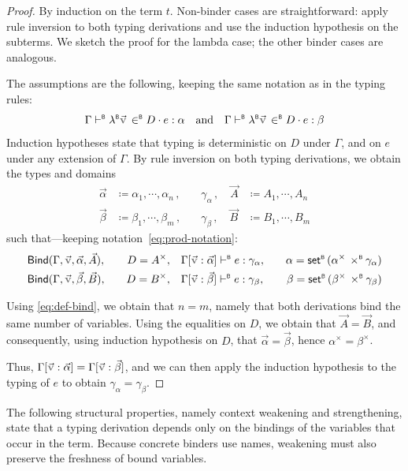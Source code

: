 \begin{proof}
  By induction on the term \(t\). Non-binder cases are straightforward: apply rule inversion to both typing derivations and use the induction hypothesis on the subterms. We sketch the proof for the lambda case; the other binder cases are analogous.
  
  The assumptions are the following, keeping the same notation as in the typing rules:
  \[
    \btype{\Gamma}{\lambdaB \vec{\var{v}} \inB D \cdot e}{\alpha} \quad\text{and}\quad
    \btype{\Gamma}{\lambdaB \vec{\var{v}} \inB D \cdot e}{\beta}
  \]
  Induction hypotheses state that typing is deterministic on \(D\) under \(\Gamma\), and on \(e\) under any extension of \(\Gamma\).
  By rule inversion on both typing derivations, we obtain the types and domains
  \[
  \begin{aligned}
    \vec\alpha &\coloneq \alpha_1, \cdots, \alpha_n\,, \quad &\gamma_\alpha\,, \quad \vec{A} &\coloneq A_1, \cdots, A_n \\
    \vec\beta &\coloneq \beta_1, \cdots, \beta_m\,, \quad    &\gamma_\beta\,,  \quad \vec{B} &\coloneq B_1, \cdots, B_m
  \end{aligned}
  \]
  such that---keeping notation~\eqref{eq:prod-notation}:
  \[
  \begin{aligned}
    &\mathsf{Bind}(\Gamma,\vec{\var{v}},\vec\alpha,\vec A),\quad &D = A^\times,\quad &\btype{\Gamma[\vec{\var{v}}:\vec\alpha]}{e}{\gamma_\alpha},\quad & \alpha = \setB(\alpha^\times \prodB \gamma_\alpha) \\
    &\mathsf{Bind}(\Gamma,\vec{\var{v}},\vec\beta,\vec B),\quad &D = B^\times,\quad &\btype{\Gamma[\vec{\var{v}}:\vec\beta]}{e}{\gamma_\beta},\quad & \beta = \setB(\beta^\times \prodB \gamma_\beta)
  \end{aligned}
  \]
  
  Using \eqref{eq:def-bind}, we obtain that \(n = m\), namely that both derivations bind the same number of variables.
  Using the equalities on \(D\), we obtain that \(\vec{A} = \vec{B}\), and consequently, using induction hypothesis on \(D\), that \(\vec\alpha = \vec\beta\), hence \(\alpha^\times = \beta^\times\).
  
  Thus, \(\Gamma[\vec{\var{v}}:\vec\alpha] = \Gamma[\vec{\var{v}}:\vec\beta]\), and we can then apply the induction hypothesis to the typing of \(e\) to obtain \(\gamma_\alpha = \gamma_\beta\).
\end{proof}

The following structural properties, namely context weakening and strengthening, state that a typing derivation depends only on the bindings of the variables that occur in the term. Because concrete binders use names, weakening must also preserve the freshness of bound variables.

